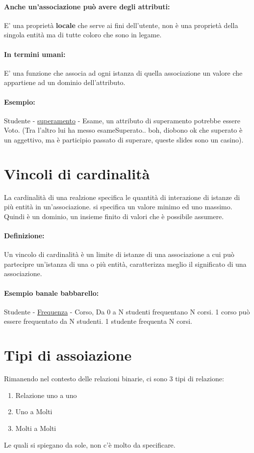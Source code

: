 \documentclass[12pt, a4paper, openany, twoside]{book}
\begin{document}
\paragraph{Anche un'associazione può avere degli attributi:} E' una proprietà
\textbf{locale} che serve ai fini dell'utente, non è una proprietà della singola
entità ma di tutte coloro che sono in legame.
\paragraph{In termini umani:} E' una funzione che associa ad ogni istanza di 
quella associazione un valore che appartiene ad un dominio dell'attributo.
\paragraph{Esempio:} Studente - \underline{superamento} - Esame, un attributo
di superamento potrebbe essere Voto. (Tra l'altro lui ha messo esameSuperato.. 
boh, diobono ok che superato è un aggettivo, ma è participio passato di superare,
queste slides sono un casino).
\section{Vincoli di cardinalità}
La cardinalità di una realzione specifica le quantità di interazione di istanze
di più entità in un'associazione. si specifica un valore minimo ed uno massimo.
Quindi è un dominio, un insieme finito di valori che è possibile assumere.
\paragraph{Definizione:} Un vincolo di cardinalità è un limite di istanze di
una associazione a cui può partecipre un'istanza di una o più entità, caratterizza
meglio il significato di una associazione.
\paragraph{Esempio banale babbarello:} Studente - \underline{Frequenza} - Corso,
Da 0 a N studenti frequentano N corsi. 1 corso può essere frequentato da N
studenti. 1 studente frequenta N corsi.
\section{Tipi di assoiazione}
Rimanendo nel contesto delle relazioni binarie, ci sono 3 tipi di relazione:
\begin{enumerate}
	\item Relazione uno a uno
	\item Uno a Molti
	\item Molti a Molti
\end{enumerate}
Le quali si spiegano da sole, non c'è molto da specificare.
\end{document}
